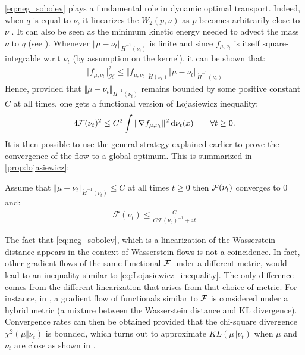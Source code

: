 \cref{eq:neg_sobolev} plays a fundamental role in dynamic optimal transport. Indeed, when $q$ is equal to $\nu$, it linearizes the $W_2(p,\nu)$ as $p$ becomes arbitrarily close to $\nu$ \cite{Villani:2009,Otto:2000,Peyre:2011}. It can also be seen as the minimum kinetic energy needed to advect the mass $\nu$ to $q$ (see \cite{mroueh2018regularized}). Whenever $\Vert \mu - \nu_t \Vert_{\dot{H}^{-1}(\nu_t)} $ is finite and since $f_{\mu,\nu_t}$ is itself square-integrable w.r.t $\nu_t$ (by assumption on the kernel), it can be shown that:
\begin{align}\label{eq:inequality_neg_sobolev}
	\Vert f_{\mu,\nu_t} \Vert^2_{\mathcal{H}} \leq \Vert f_{\mu,\nu_t} \Vert_{\dot{H}(\nu_t)} \Vert  \mu -\nu_t\Vert_{\dot{H}^{-1}(\nu_t)}  
\end{align}
Hence, provided that $\Vert \mu - \nu_t \Vert_{\dot{H}^{-1}(\nu_t)} $ remains bounded by some positive constant $C$ at all times, one gets a functional version of Lojasiewicz inequality:
\begin{align}\label{eq:Lojasiewicz_inequality}
	4{{\mathcal F}}(\nu_t)^2\leq C^2 \int \Vert \nabla f_{\mu,\nu_t} \Vert^2 \mathop{}\!\mathrm{d} \nu_t(x)  \qquad \forall t\geq 0.
\end{align} 
It is then possible to use the general strategy explained earlier to prove the convergence of the flow to a global optimum. This is summarized in \cref{prop:lojasiewicz}:
\begin{proposition}\label{prop:lojasiewicz}
	Assume that $\Vert \mu - \nu_t \Vert_{\dot{H}^{-1}(\nu_t)} \leq C$ at all times $t\geq 0$ then ${{\mathcal F}}(\nu_t)$ converges to $0$ and:
	\begin{align}
	\mathcal{F}(\nu_t)\leq \frac{C}{C\mathcal{F}(\nu_0)^{-1} + 4t}
	\end{align}
\end{proposition}
The fact that \cref{eq:neg_sobolev}, which is a linearization of the Wasserstein distance appears in the context of Wasserstein flows is not a coincidence. In fact, other gradient flows of the same functional ${{\mathcal F}}$ under a different metric, would lead to an inequality similar to \cref{eq:Lojasiewicz_inequality}. The only difference comes from the different linearization that arises from that choice of metric. For instance, in \cite{Rotskoff:2019}, a gradient flow of functionals similar to ${{\mathcal F}}$ is considered under a hybrid metric (a mixture between the Wasserstein distance and KL divergence). Convergence rates can then be obtained provided that the chi-square divergence $\chi^2(\mu\Vert \nu_t)$ is bounded, which turns out to approximate $KL(\mu\Vert \nu_t)$ when $\mu$ and $\nu_t$ are close as shown in .

